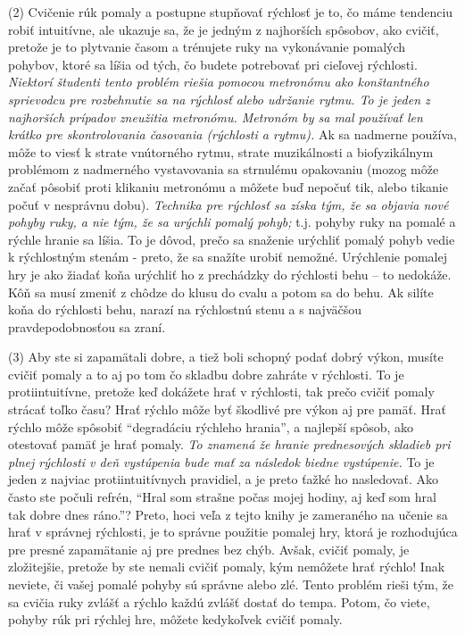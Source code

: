 (2) Cvičenie rúk pomaly a postupne stupňovať rýchlosť je to, čo máme tendenciu robiť intuitívne, ale ukazuje sa, že je jedným z najhorších spôsobov, ako cvičiť, pretože je to plytvanie časom a trénujete ruky na vykonávanie pomalých pohybov, ktoré sa líšia od tých, čo budete potrebovať pri cieľovej rýchlosti. \emph{Niektorí študenti tento problém riešia pomocou metronómu ako konštantného sprievodcu pre rozbehnutie sa na rýchlosť alebo udržanie rytmu. To je jeden z najhorších prípadov zneužitia metronómu. Metronóm by sa mal používať len krátko pre skontrolovania časovania (rýchlosti a rytmu).} Ak sa nadmerne používa, môže to viesť k strate vnútorného rytmu, strate muzikálnosti a biofyzikálnym problémom z nadmerného vystavovania sa strnulému opakovaniu (mozog môže začať pôsobiť proti klikaniu metronómu a môžete buď nepočuť tik, alebo tikanie počuť v nesprávnu dobu). \emph{Technika pre rýchlosť sa získa tým, že sa objavia nové pohyby ruky, a nie tým, že sa urýchli pomalý pohyb;} t.j. pohyby ruky na pomalé a rýchle hranie sa líšia. To je dôvod, prečo sa snaženie urýchliť pomalý pohyb vedie k rýchlostným stenám - preto, že sa snažíte urobiť nemožné. Urýchlenie pomalej hry je ako žiadať koňa urýchliť ho z prechádzky do rýchlosti behu – to nedokáže. Kôň sa musí zmeniť z chôdze do klusu do cvalu a potom sa do behu. Ak silíte koňa do rýchlosti behu, narazí na rýchlostnú stenu a s najväčšou pravdepodobnosťou sa zraní.

(3) Aby ste si zapamätali dobre, a tiež boli schopný podať dobrý výkon, musíte cvičiť pomaly a to aj po tom čo skladbu dobre zahráte v rýchlosti. To je protiintuitívne, pretože keď dokážete hrať v rýchlosti, tak prečo cvičiť pomaly strácať toľko času? Hrať rýchlo môže byť škodlivé pre výkon aj pre pamäť. Hrať rýchlo môže spôsobiť “degradáciu rýchleho hrania”, a najlepší spôsob, ako otestovať pamäť je hrať pomaly. \emph{To znamená že hranie prednesových skladieb pri plnej rýchlosti v deň vystúpenia bude mať za následok biedne vystúpenie.}  To je jeden z najviac protiintuitívnych pravidiel, a je preto ťažké ho nasledovať. Ako často ste počuli refrén, “Hral som strašne počas mojej hodiny, aj keď som hral tak dobre dnes ráno.”? Preto, hoci veľa z tejto knihy je zameraného na učenie sa hrať v správnej rýchlosti, je to správne použitie pomalej hry, ktorá je rozhodujúca pre presné zapamätanie aj pre prednes bez chýb. Avšak, cvičiť pomaly, je zložitejšie, pretože by ste nemali cvičiť pomaly, kým nemôžete hrať rýchlo! Inak neviete, či vašej pomalé pohyby sú správne alebo zlé. Tento problém rieši tým, že sa cvičia ruky zvlášť a rýchlo každú zvlášť dostať do tempa. Potom, čo viete, pohyby rúk pri rýchlej hre, môžete kedykoľvek cvičiť pomaly.

